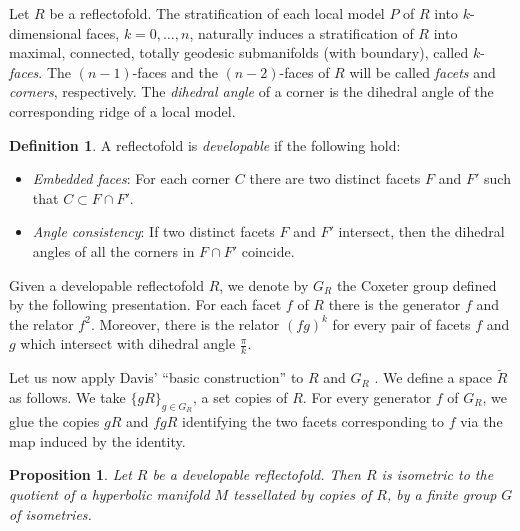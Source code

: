 \documentclass{amsart}
\makeatletter
\newcommand{\mylabel}[2]{#2\def\@currentlabel{#2}\label{#1}}
\newtheorem{prop}[lemma]{Proposition}
\theoremstyle{definition}
\newtheorem{defn}[lemma]{Definition}
\theoremstyle{remark}
\newtheorem{rem}[lemma]{Remark}
\makeatother
\begin{document}
Let $R$ be a reflectofold. The stratification of each local model $P$ of $R$ into $k$-dimensional faces, $k = 0, \ldots, n$, naturally induces a stratification of $R$ into maximal, connected, totally geodesic submanifolds (with boundary), called $k$-\emph{faces}. The $(n-1)$-faces and the $(n-2)$-faces of $R$ will be called \emph{facets} and \emph{corners}, respectively. The \emph{dihedral angle} of a corner is the dihedral angle of the corresponding ridge of a local model. 

\begin{defn}
   A reflectofold is \emph{developable} if the following hold:
    \begin{itemize}
        \item[\mylabel{EF}{(EF)}] \emph{Embedded faces}: For each corner $C$ there are two distinct facets $F$ and $F'$ such that $C \subset F \cap F'$.
        \item[\mylabel{AC}{(AC)}] \emph{Angle consistency}: If two distinct facets $F$ and $F'$ intersect, then the dihedral angles of all the corners in $F \cap F'$ coincide.
    \end{itemize}    
\end{defn}


Given a developable reflectofold $R$, we denote by $G_R$ the Coxeter group defined by the following presentation. For each facet $f$ of $R$ there is the generator $f$ and the relator $f^2$. Moreover, there is the relator $(fg)^k$ for every pair of facets $f$ and $g$ which intersect with dihedral angle $\frac{\pi}{k}$.


Let us now apply Davis' ``basic construction'' to $R$ and $G_R$ \cite{D}.
We define a space $\widetilde{R}$ as follows. We take $\{gR\}_{g\in G_R}$, a set copies of $R$. For every generator $f$ of $G_R$, we glue the copies $gR$ and $fgR$ identifying the two facets corresponding to $f$ via the map induced by the identity.

\begin{prop}
\label{tassell}
    Let $R$ be a developable reflectofold. Then %
    $R$ is isometric to the quotient of a hyperbolic manifold $M$ tessellated by copies of $R$, by a finite group $G$ of isometries. 
\end{prop}
\end{document}
